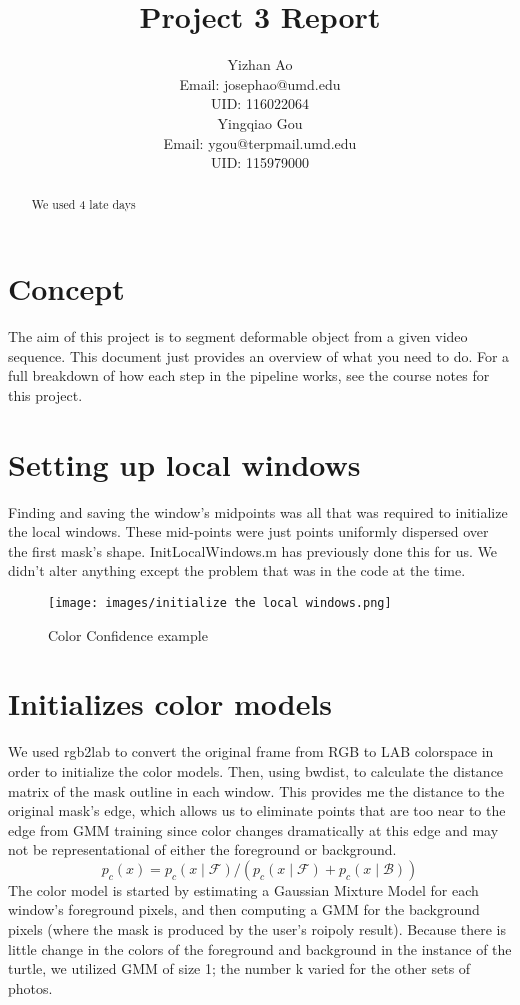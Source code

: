 \documentclass[15pt]{article}
\title{Project 3 Report}
\author{%
  Yizhan Ao\\
  Email: josephao@umd.edu   \\
  UID: 116022064\\
  \And
  Yingqiao Gou\\
  Email: ygou@terpmail.umd.edu\\
  UID: 115979000\\
}
\begin{document}
 
\maketitle

\begin{abstract}
We used 4 late days
\end{abstract}

\section{Concept}
The aim of this project is to segment deformable object from a given video sequence. This document just provides an overview of what you need to do. For a full breakdown of how each step in the pipeline works, see the course notes for this project.

\section{Setting up local windows}
Finding and saving the window's midpoints was all that was required to initialize the local windows. These mid-points were just points uniformly dispersed over the first mask's shape. InitLocalWindows.m has previously done this for us. We didn't alter anything except the problem that was in the code at the time.
\\
\begin{subfigure}{.5\textwidth}
  \texttt{[image: images/initialize the local windows.png]}
  \caption{Color Confidence example }
  \label{fig:sub1}
\end{subfigure}%


\section{Initializes color models}
We used rgb2lab to convert the original frame from RGB to LAB colorspace in order to initialize the color models. Then, using bwdist, to calculate the distance matrix of the mask outline in each window. This provides me the distance to the original mask's edge, which allows us to eliminate points that are too near to the edge from GMM training since color changes dramatically at this edge and may not be representational of either the foreground or background.
\begin{equation}
p_{c}(x)=p_{c}(x \mid \mathcal{F}) /\left(p_{c}(x \mid \mathcal{F})+p_{c}(x \mid \mathcal{B})\right)
\end{equation}
The color model is started by estimating a Gaussian Mixture Model for each window's foreground pixels, and then computing a GMM for the background pixels (where the mask is produced by the user's roipoly result). Because there is little change in the colors of the foreground and background in the instance of the turtle, we utilized GMM of size 1; the number k varied for the other sets of photos.
\end{document}
